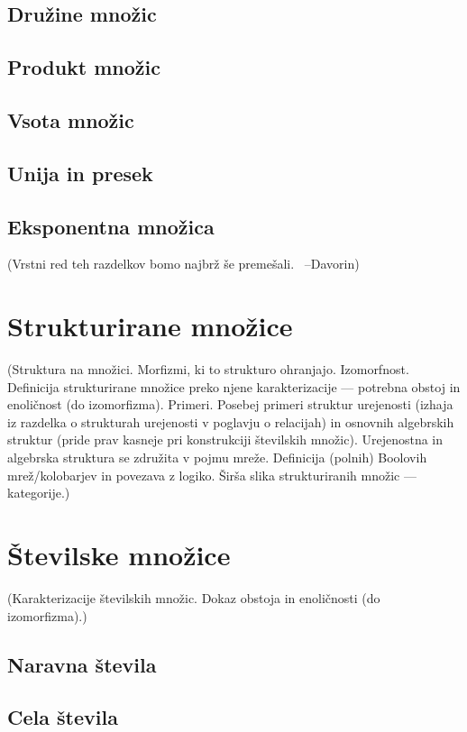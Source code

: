 \documentclass[11pt,a4paper,twoside]{book}
\newcommand{\davorin}[1]{{\small\textcolor{davorincolor}{(#1 \ \mbox{--Davorin})}}}
\newcommand{\note}[1]{{\small\textcolor{notecolor}{(#1)}}}
\begin{document}
                \section{Družine množic}
                \section{Produkt množic}
                \section{Vsota množic}
                \section{Unija in presek}
                \section{Eksponentna množica}
                        \davorin{Vrstni red teh razdelkov bomo najbrž še premešali.}

        
        

        \chapter{Strukturirane množice}
                \note{Struktura na množici. Morfizmi, ki to strukturo ohranjajo. Izomorfnost. Definicija strukturirane množice preko njene karakterizacije --- potrebna obstoj in enoličnost (do izomorfizma). Primeri. Posebej primeri struktur urejenosti (izhaja iz razdelka o strukturah urejenosti v poglavju o relacijah) in osnovnih algebrskih struktur (pride prav kasneje pri konstrukciji številskih množic). Urejenostna in algebrska struktura se združita v pojmu mreže. Definicija (polnih) Boolovih mrež/kolobarjev in povezava z logiko. Širša slika strukturiranih množic --- kategorije.}

        \chapter{Številske množice}
                \note{Karakterizacije številskih množic. Dokaz obstoja in enoličnosti (do izomorfizma).}
                \section{Naravna števila}
                \section{Cela števila}
\end{document}
